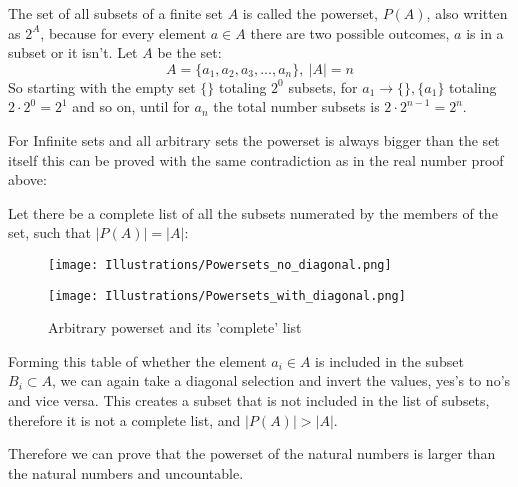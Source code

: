 The set of all subsets of a finite set $A$ is called the powerset, $P(A)$, also written as $2^{A}$, because for every element $a \in A$ there are two possible outcomes, $a$ is in a subset or it isn't. Let $A$ be the set: $$A = \{ a_{1}, a_{2}, a_{3},..., a_{n}\},\ \lvert{A}\rvert = n$$
So starting with the empty set $\{ \}$ totaling $2^{0}$ subsets, for $a_{1} \rightarrow \{\}, \{a_{1}\}$ totaling $2\cdot2^{0} = 2^{1}$ and so on, until for $a_{n}$ the total number subsets is $2\cdot2^{n-1} =2^{n}$.
\bigskip

For Infinite sets and all arbitrary sets the powerset is always bigger than the set itself this can be proved with the same contradiction as in the real number proof above:
\bigskip

Let there be a complete list of all the subsets numerated by the members of the set, such that $\lvert{P(A)}\rvert = \lvert{A}\rvert$:

\begin{figure}[H]
    \centering
    \begin{minipage}{0.45\textwidth}
        \centering
        \texttt{[image: Illustrations/Powersets\_no\_diagonal.png]}
        \label{fig:power_set1}
    \end{minipage}
    \hfill
    \begin{minipage}{0.45\textwidth}
        \centering
        \texttt{[image: Illustrations/Powersets\_with\_diagonal.png]}
        \label{fig:power_set2}
    \end{minipage}
    \caption{Arbitrary powerset and its 'complete' list}
\end{figure}

Forming this table of whether the element $a_{i} \in A$ is included in the subset $B_{i} \subset A$, we can again take a diagonal selection and invert the values, yes's to no's and vice versa. This creates a subset that is not included in the list of subsets, therefore it is not a complete list, and $\lvert{P(A)}\rvert > \lvert{A}\rvert$.
\bigskip

Therefore we can prove that the powerset of the natural  numbers is larger than the natural  numbers and uncountable.
\bigskip




